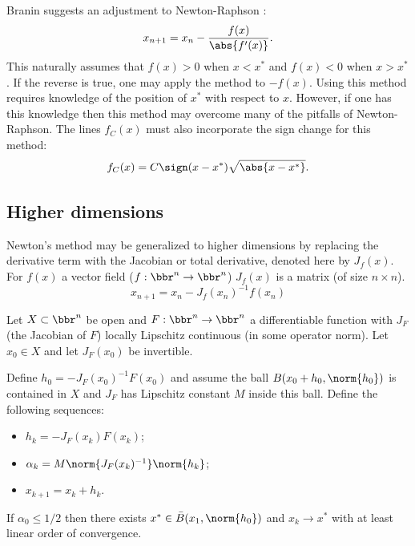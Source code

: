 \documentclass{article}
\begin{document}
Branin suggests an adjustment to Newton-Raphson \cite{branin1972widely}:
\begin{equation*}
x_{n+1} = x_n - \frac{f(x)}{\abs{f'(x)}} .
\end{equation*}
This naturally assumes that $f(x) > 0$ when $x < x^*$ and $f(x) < 0$ when $x > x^*$.
If the reverse is true, one may apply the method to $-f(x)$.
Using this method requires knowledge of the position of $x^*$ with respect to $x$.
However, if one has this knowledge then this method may overcome many of the pitfalls of Newton-Raphson.
The lines $f_C(x)$ must also incorporate the sign change for this method:
\begin{equation*}
f_C(x) = C \sign(x - x^*) \sqrt{\abs{x-x^*}} .
\end{equation*}

\subsection{Higher dimensions}


Newton's method may be generalized to higher dimensions by replacing the derivative term with the Jacobian or total derivative, denoted here by $J_f(x)$.
For $f(x)$ a vector field ($f:\bbr^n \to \bbr^n$) $J_f(x)$ is a matrix (of size $n \times n$).
\begin{equation} \label{eq:NRgen}
	x_{n+1} = x_n - J_f(x_n)^{-1} f(x_n)
\end{equation}

\begin{thm}
Let $X \subset \bbr^n$ be open and $F:\bbr^n \to \bbr^n$ a differentiable function with $J_F$ (the Jacobian of $F$) locally Lipschitz continuous (in some operator norm).
Let $x_0 \in X$ and let $J_F(x_0)$ be invertible.

Define $h_0 = -J_F(x_0)^{-1} F(x_0)$ and assume the ball $B(x_0 + h_0, \norm{h_0})$ is contained in $X$ and $J_F$ has Lipschitz constant $M$ inside this ball.
Define the following sequences: \begin{itemize}
\item $h_k = -J_F(x_k) F(x_k)$;
\item $\alpha_k = M \norm{J_F(x_k)^{-1}} \norm{h_k}$;
\item $x_{k+1} = x_k + h_k$.
\end{itemize}

If $\alpha_0 \leq 1/2$ then there exists $x^* \in \bar{B}(x_1, \norm{h_0})$ and $x_k \to x^*$ with at least linear order of convergence.
\end{thm}
\end{document}
